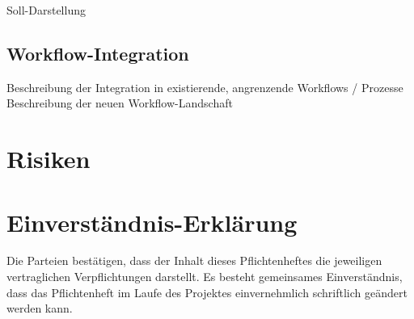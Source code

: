 \documentclass[
11pt,
a4paper,
ngerman,
]{article}
\newcommand{\descriptionWhat}[1]{%
	\begin{itshape}%
	#1 \\%
	\end{itshape}%
}
\begin{document}
\descriptionWhat{Soll-Darstellung}

\subsection{Workflow-Integration}

\descriptionWhat{Beschreibung der Integration in existierende, angrenzende Workflows / Prozesse
Beschreibung der neuen Workflow-Landschaft}

\newpage

\section{Risiken}


\newpage

\section{Einverständnis-Erklärung}

Die Parteien bestätigen, dass der Inhalt dieses Pflichtenheftes die jeweiligen vertraglichen Verpflichtungen darstellt. Es besteht gemeinsames Einverständnis, dass das Pflichtenheft im Laufe des Projektes einvernehmlich schriftlich geändert werden kann.
\end{document}

